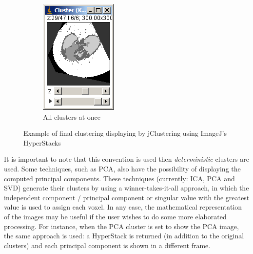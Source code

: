 \documentclass[11pt]{article} %
\begin{document}
\begin{figure}
\begin{subfigure}[b]{0.3\textwidth}
                \includegraphics[width=\textwidth]{figures/k-means_results_6}
                \caption{All clusters at once}
                \label{fig:k-means_res_6}
	\end{subfigure}%
	 \caption{Example of final clustering displaying by jClustering using ImageJ's HyperStacks}\label{fig:results_example}
\end{figure}

It is important to note that this convention is used then {\em deterministic} clusters are used. Some techniques, such as PCA,
also have the possibility of displaying the computed principal components. These techniques (currently: ICA, PCA and SVD) 
generate their clusters by using a winner-takes-it-all approach, in which the independent component / principal component or
singular value with the greatest value is used to assign each voxel. In any case, the mathematical representation of the images
may be useful if the user wishes to do some more elaborated processing. For instance, when the PCA cluster is set to show
the PCA image, the same approach is used: a HyperStack is returned (in addition to the original clusters) and each principal
component is shown in a different frame.
\end{document}
